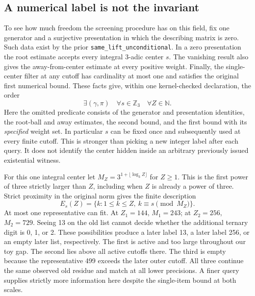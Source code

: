 \documentclass[12pt,letterpaper]{article}
\begin{document}
\subsection{A numerical label is not the invariant}
To see how much freedom the screening procedure has on this field, fix one generator and a surjective presentation in which the describing matrix is zero. Such data exist by the prior \texttt{same\_lift\_unconditional}. In a zero presentation the root estimate accepts every integral 3-adic center \(s\). The vanishing result also gives the away-from-center estimate at every positive weight. Finally, the single-center filter at any cutoff has cardinality at most one and satisfies the original first numerical bound. These facts give, within one kernel-checked declaration, the order
\[
 \exists(\gamma,\pi)\quad\forall s\in\mathbb Z_3\quad\forall Z\in\mathbb N .
\]
Here the omitted predicate consists of the generator and presentation identities, the root-ball and away estimates, the second bound, and the first bound with its \emph{specified} weight set. In particular \(s\) can be fixed once and subsequently used at every finite cutoff. This is stronger than picking a new integer label after each query. It does not identify the center hidden inside an arbitrary previously issued existential witness.

For this one integral center let \(M_Z=3^{1+\lfloor\log_3 Z\rfloor}\) for \(Z\ge1\). This is the first power of three strictly larger than \(Z\), including when \(Z\) is already a power of three. Strict proximity in the original norm gives the finite description
\[
 E_s(Z)=\{k:1\le k\le Z,\ k\equiv s\pmod {M_Z}\}.
\]
At most one representative can fit. At \(Z_1=144\), \(M_1=243\); at \(Z_2=256\), \(M_2=729\). Seeing 13 on the old list cannot decide whether the additional ternary digit is 0, 1, or 2. These possibilities produce a later label 13, a later label 256, or an empty later list, respectively. The first is active and too large throughout our toy gap. The second lies above all active cutoffs there. The third is empty because the representative 499 exceeds the later outer cutoff. All three continue the same observed old residue and match at all lower precisions. A finer query supplies strictly more information here despite the single-item bound at both scales.
\end{document}
